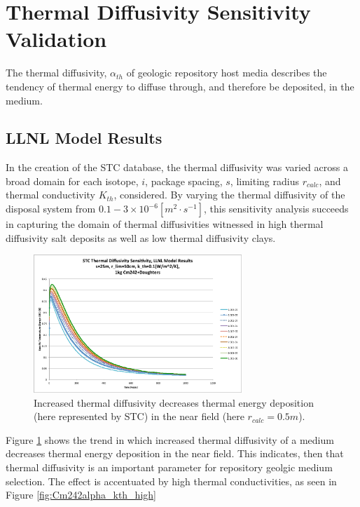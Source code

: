 \section{Thermal Diffusivity Sensitivity Validation}\label{sec:diffusivity}
The thermal diffusivity, $\alpha_{th}$ of geologic repository host media 
describes the tendency of thermal energy to diffuse through, and therefore be 
deposited, in the medium.

\FloatBarrier
\subsection{LLNL Model Results}

In the creation of the \gls{STC} database, the thermal diffusivity was varied 
across a broad domain for each isotope, $i$, package spacing, $s$, limiting 
radius $r_{calc}$, and thermal conductivity $K_{th}$, considered.  By 
varying the thermal diffusivity of the disposal system from $0.1-3\times 
10^{-6} [m^2\cdot s^{-1}]$, this sensitivity analysis succeeds in capturing the domain of 
thermal diffusivities witnessed in high thermal diffusivity salt deposits as 
well as low thermal diffusivity clays.

\begin{figure}[htbp!]
\begin{center}
\includegraphics[width=0.7\textwidth]{./chapters/demonstration/diffusivity/Cm242alpha_kth_low.eps}
\end{center}
\caption[$K_{th}$ Sensitivity to $\alpha_{th}$ for $k_{th}$]{Increased thermal diffusivity decreases thermal energy deposition 
(here represented by \gls{STC}) in the near field (here $r_{calc} = 0.5m$).}
\label{fig:Cm242alpha_kth_low}
\end{figure}


Figure \ref{fig:Cm242alpha_kth_low} shows the trend in which increased thermal diffusivity of a medium decreases thermal energy 
deposition in the near field. This indicates, then that thermal diffusivity is 
an important parameter for repository geolgic medium selection. The effect is 
accentuated by high thermal conductivities, as seen in 
Figure \ref{fig:Cm242alpha_kth_high}

